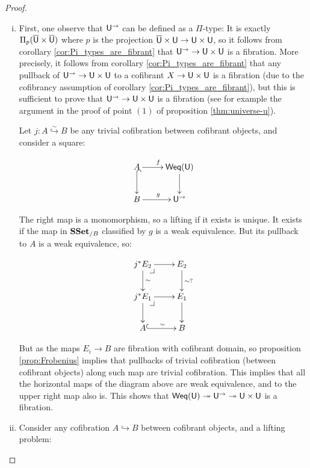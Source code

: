\documentclass[reqno,10pt,a4paper,oneside,draft]{amsart}
\begin{document}
\begin{proof}
\leavevmode
\begin{enumerate}[(i)]

\item First, one observe that $\mathsf{U}^{\rightarrow}$ can be defined as a $\Pi$-type: It is exactly $\Pi_p(\overline{\mathsf{U}} \times \overline{\mathsf{U}})$ where $p$ is the projection $\overline{\mathsf{U}} \times \mathsf{U} \rightarrow \mathsf{U} \times \mathsf{U}$,
so it follows from corollary \ref{cor:Pi_types_are_fibrant} that $\mathsf{U}^{\rightarrow} \rightarrow \mathsf{U} \times \mathsf{U}$ is a fibration.
More precisely, it follows from corollary  \ref{cor:Pi_types_are_fibrant} that any pullback of  $\mathsf{U}^{\rightarrow} \rightarrow \mathsf{U} \times \mathsf{U}$ to a cofibrant
$X \rightarrow \mathsf{U} \times \mathsf{U}$ is a fibration (due to the cofibrancy assumption of corollary \ref{cor:Pi_types_are_fibrant}),
but this is sufficient to prove that $\mathsf{U}^{\rightarrow} \rightarrow \mathsf{U} \times \mathsf{U}$ is a fibration (see for example the argument
in the proof of point $(1)$ of proposition \ref{thm:universe-u}).


Let $j:A \overset{\sim}{\hookrightarrow} B$ be any trivial cofibration between cofibrant objects, and consider a square:

\[ \xymatrix{ A \ar@{^{(}->}[d] \ar[r]^{f} & \mathsf{Weq}(\U) \ar[d] \\
B \ar[r]^{g} & \U^{\rightarrow}
}\]

The right map is a monomorphism, so a lifting if it exists is unique. It exists if the map in $\mathbf{SSet}_{/B}$ classified by $g$ is a weak equivalence. But its pullback to $A$ is a weak equivalence, so:

\[ \xymatrix{ 
j^* E_2 \ar[d]^{\sim} \ar[r] \drpullback & E_2 \ar[d]^{\sim ?} \\
j^* E_1 \ar[r] \ar[d] \drpullback  & E_1 \ar[d] \\
A \ar@{^{(}->}[r]^{\sim} & B \\
}\]

But as the maps $E_i \rightarrow B$ are fibration with cofibrant domain, so proposition \ref{prop:Frobenius} implies that pullbacks of trivial cofibration (between cofibrant objects) along such map are trivial cofibration. This implies that all the horizontal maps of the diagram above are weak equivalence, and to the upper right map also is. This shows that $\mathsf{Weq}(\mathsf{U}) \twoheadrightarrow \mathsf{U}^{\rightarrow} \twoheadrightarrow \mathsf{U} \times \mathsf{U}$ is a fibration.




\item Consider any cofibration $A\hookrightarrow B$ between cofibrant objects, and a lifting problem:


\end{enumerate}
\end{proof}
\end{document}
